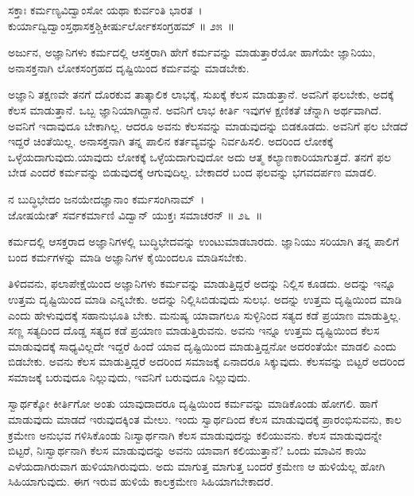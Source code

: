 \begin{shloka}
ಸಕ್ತಾಃ ಕರ್ಮಣ್ಯವಿದ್ವಾಂಸೋ ಯಥಾ ಕುರ್ವಂತಿ ಭಾರತ~।\\ಕುರ್ಯಾದ್ವಿದ್ವಾಂಸ್ತಥಾಸಕ್ತಶ್ಚಿಕೀರ್ಷುರ್ಲೋಕಸಂಗ್ರಹಮ್ \hfill॥ ೨೫~॥
\end{shloka}

\begin{artha}
ಅರ್ಜುನ, ಅಜ್ಞಾನಿಗಳು ಕರ್ಮದಲ್ಲಿ ಆಸಕ್ತರಾಗಿ ಹೇಗೆ ಕರ್ಮವನ್ನು ಮಾಡುತ್ತಾರೆಯೋ ಹಾಗೆಯೇ ಜ್ಞಾನಿಯು, ಅನಾಸಕ್ತನಾಗಿ ಲೋಕಸಂಗ್ರಹದ ದೃಷ್ಟಿಯಿಂದ ಕರ್ಮವನ್ನು ಮಾಡಬೇಕು.
\end{artha}

ಅಜ್ಞಾನಿ ತಕ್ಷಣವೇ ತನಗೆ ದೊರಕುವ ತಾತ್ಕಾಲಿಕ ಲಾಭಕ್ಕೆ, ಸುಖಕ್ಕೆ ಕೆಲಸ ಮಾಡುತ್ತಾನೆ. ಅವನಿಗೆ ಫಲಬೇಕು, ಅದಕ್ಕೆ ಕೆಲಸ ಮಾಡುತ್ತಾನೆ. ಒಬ್ಬ ಜ್ಞಾನಿಯಾಗಿದ್ದಾನೆ. ಅವನಿಗೆ ಲಾಭ ಕೀರ್ತಿ ಇವುಗಳ ಕ್ಷಣಿಕತೆ ಚೆನ್ನಾಗಿ ಅರ್ಥವಾಗಿದೆ. ಅವನಿಗೆ ಇದಾವುದೂ ಬೇಕಾಗಿಲ್ಲ. ಆದರೂ ಅವನು ಕೆಲಸವನ್ನು ಮಾಡುವುದನ್ನು ಬಿಡಕೂಡದು. ಅವನಿಗೆ ಫಲ ಬೇಡದೆ ಇದ್ದರೆ ಚಿಂತೆಯಿಲ್ಲ. ಅನಾಸಕ್ತನಾಗಿ ತನ್ನ ಪಾಲಿನ ಕರ್ತವ್ಯವನ್ನು ನಿರ್ವಹಿಸಲಿ. ಅದರಿಂದ ಲೋಕಕ್ಕೆ ಒಳ್ಳೆಯದಾಗುವುದು.\break ಯಾವುದು ಲೋಕಕ್ಕೆ ಒಳ್ಳೆಯದಾಗುವುದೋ ಅದು ಆತ್ಮ ಕಲ್ಯಾಣಕಾರಿಯಾಗುತ್ತದೆ. ತನಗೆ ಫಲ ಬೇಡ ಎಂದರೆ ಕರ್ಮವನ್ನು ಬಿಡುವುದಕ್ಕೆ ಆಗುವುದಿಲ್ಲ. ಬೇಕಾದರೆ ಬಂದ ಫಲವನ್ನು ಭಗವದರ್ಪಣ ಮಾಡಲಿ.

\begin{shloka}
ನ ಬುದ್ಧಿಭೇದಂ ಜನಯೇದಜ್ಞಾನಾಂ ಕರ್ಮಸಂಗಿನಾಮ್~।\\ಜೋಷಯೇತ್ ಸರ್ವಕರ್ಮಾಣಿ ವಿದ್ವಾನ್ ಯುಕ್ತಃ ಸಮಾಚರನ್ \hfill॥ ೨೬~॥
\end{shloka}

\begin{artha}
ಕರ್ಮದಲ್ಲಿ ಆಸಕ್ತರಾದ ಅಜ್ಞಾನಿಗಳಲ್ಲಿ ಬುದ್ಧಿಭೇದವನ್ನು ಉಂಟುಮಾಡಬಾರದು. ಜ್ಞಾನಿಯು ಸರಿಯಾಗಿ ತನ್ನ ಪಾಲಿಗೆ ಬಂದ ಕರ್ಮಗಳನ್ನು ಮಾಡಿ ಅಜ್ಞಾನಿಗಳ ಕೈಯಿಂದಲೂ ಮಾಡಿಸಬೇಕು.
\end{artha}

ತಿಳಿದವನು, ಫಲಾಪೇಕ್ಷೆಯಿಂದ ಅಜ್ಞಾನಿಗಳು ಕರ್ಮವನ್ನು ಮಾಡುತ್ತಿದ್ದರೆ ಅದನ್ನು ನಿಲ್ಲಿಸ ಕೂಡದು. ಅದನ್ನು ಇನ್ನೂ ಉತ್ತಮ ದೃಷ್ಟಿಯಿಂದ ಮಾಡಿ ಎನ್ನಬೇಕು. ಅದನ್ನು ನಿಲ್ಲಿಸಿಬಿಡುವುದು ಸುಲಭ. ಅದನ್ನು ಉತ್ತಮ ದೃಷ್ಟಿಯಿಂದ ಮಾಡಿ ಎಂದು ಹೇಳುವುದಕ್ಕೆ ಸಹಾನುಭೂತಿ ಬೇಕು. ಮನುಷ್ಯ ಯಾವಾಗಲೂ ಸುಳ್ಳಿನಿಂದ ಸತ್ಯದ ಕಡೆ ಪ್ರಯಾಣ ಮಾಡುತ್ತಿಲ್ಲ. ಸಣ್ಣ ಸತ್ಯದಿಂದ ದೊಡ್ಡ ಸತ್ಯದ ಕಡೆ ಪ್ರಯಾಣ ಮಾಡುತ್ತಿರುವನು. ಅವನು ಇನ್ನೂ ಉತ್ತಮ ದೃಷ್ಟಿಯಿಂದ ಕೆಲಸ ಮಾಡುವುದಕ್ಕೆ ಸಾಧ್ಯವಿಲ್ಲದೇ ಇದ್ದರೆ ಹಿಂದೆ ಯಾವ ದೃಷ್ಟಿಯಿಂದ ಮಾಡುತ್ತಿದ್ದನೋ ಅದರಂತೆಯೇ ಮಾಡಲಿ ಎಂದು ಬಿಡಬೇಕು. ಅವನು ಕೆಲಸ ಮಾಡುತ್ತಿದ್ದರೆ ಅದರಿಂದ ಸಮಾಜಕ್ಕೆ ಏನಾದರೂ ಸಿಕ್ಕುವುದು. ಕೆಲಸವನ್ನು ಬಿಟ್ಟರೆ ಅದರಿಂದ ಸಮಾಜಕ್ಕೆ ಬರುವುದೂ ನಿಲ್ಲುವುದು, ಇವನಿಗೆ ಬರುವುದೂ ನಿಲ್ಲುವುದು.

ಸ್ವಾರ್ಥಕ್ಕೋ ಕೀರ್ತಿಗೋ ಅಂತು ಯಾವುದಾದರೂ ದೃಷ್ಟಿಯಿಂದ ಕರ್ಮವನ್ನು ಮಾಡಿಕೊಂಡು ಹೋಗಲಿ. ಹಾಗೆ ಮಾಡುವುದು ಮಾಡದೆ ಇರುವುದಕ್ಕಿಂತ ಮೇಲು. ಇಂದು ಸ್ವಾರ್ಥದಿಂದ ಕೆಲಸ ಮಾಡುವುದಕ್ಕೆ ಪ್ರಾರಂಭಿಸುವನು, ಕಾಲ ಕ್ರಮೇಣ ಅನುಭವ ಗಳಿಸಿಕೊಂಡು ನಿಃಸ್ವಾರ್ಥನಾಗಿ ಕೆಲಸ ಮಾಡುವುದನ್ನು ಕಲಿಯುವನು. ಕೆಲಸ ಮಾಡುವುದನ್ನೇ ಬಿಟ್ಟರೆ, ನಿಃಸ್ವಾರ್ಥನಾಗಿ ಕೆಲಸ ಮಾಡುವುದನ್ನು ಅವನು ಯಾವಾಗ ಕಲಿಯುತ್ತಾನೆ? ಒಂದು ಮಾವಿನ ಕಾಯಿ ಎಳೆಯದಾಗಿರುವಾಗ ಹುಳಿಯಾಗಿರುವುದು. ಅದು ಮಾಗುತ್ತ ಮಾಗುತ್ತ ಬಂದರೆ ಕ್ರಮೇಣ ಆ ಹುಳಿಯೆಲ್ಲ ಹೋಗಿ ಸಿಹಿಯಾಗುವುದು. ಈಗ ಇರುವ ಹುಳಿಯೆ ಕಾಲಕ್ರಮೇಣ ಸಿಹಿಯಾಗ\-ಬೇಕಾದರೆ.

